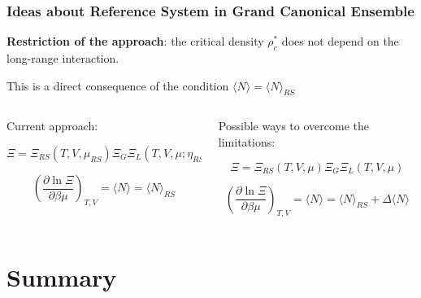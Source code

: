 \documentclass[8pt]{beamer}
\begin{document}
	\begin{frame}
		\frametitle{Ideas about Reference System in Grand Canonical Ensemble}
		
		\textbf{Restriction of the approach}: the critical density $\rho^*_c$ does not depend on the long-range interaction.
		
		This is a direct consequence of the condition $\langle N \rangle = \langle N \rangle_{RS}$
		
		\vspace{10mm}
		
		\begin{columns}
			\begin{column}{0.5\textwidth}
				Current approach:
				
				\begin{equation*}
					\Xi = \Xi_{RS}(T,V,\mu_{RS}) \Xi_G \Xi_L(T, V, \mu; \eta_{RS})
				\end{equation*}
				
				\begin{equation*}
					\left(\frac{\partial \ln \Xi}{\partial \beta\mu}\right)_{T,V} = \langle N \rangle = \langle N \rangle_{RS}
				\end{equation*}
			\end{column}
			
			\begin{column}{0.5\textwidth}
				Possible ways to overcome the limitations:
				
				\begin{equation*}
					\Xi = \Xi_{RS}(T,V,\mu) \Xi_G \Xi_L(T, V, \mu)
				\end{equation*}
				
				\begin{equation*}
					\left(\frac{\partial \ln \Xi}{\partial \beta\mu}\right)_{T,V} = \langle N \rangle = \langle N \rangle_{RS} + \Delta \langle N \rangle
				\end{equation*}
			\end{column}
			
			
		\end{columns}
	\end{frame}
	
	\section{Summary}
	
\end{document}
